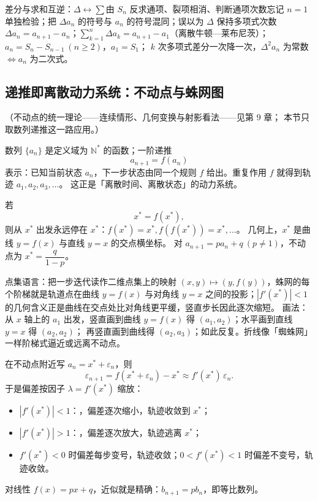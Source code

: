 \begin{explore}
\begin{conccard}[一级]{差分与求和互逆：$\Delta\leftrightarrow\sum$}{由 $S_n$ 反求通项、裂项相消、判断通项次数}{忘记 $n=1$ 单独检验；把 $\Delta a_n$ 的符号与 $a_n$ 的符号混同；误以为 $\Delta$ 保持多项式次数}
$\Delta a_n=a_{n+1}-a_n$；$\sum_{k=1}^n\Delta a_k=a_{n+1}-a_1$（离散牛顿—莱布尼茨）；
$a_n=S_n-S_{n-1}\ (n\ge2)$，$a_1=S_1$；
$k$ 次多项式差分一次降一次，$\Delta^2a_n$ 为常数 $\iff a_n$ 为二次式。
\end{conccard}

\subsection{递推即离散动力系统：不动点与蛛网图}

（不动点的统一理论——连续情形、几何变换与射影看法——见第 9 章；
本节只取数列递推这一路应用。）


数列 $\{a_n\}$ 是定义域为 $\mathbb{N}^*$ 的函数；一阶递推
\[
  a_{n+1}=f(a_n)
\]
表示：已知当前状态 $a_n$，下一步状态由同一个规则 $f$ 给出。重复作用 $f$ 就得到轨迹 $a_1,a_2,a_3,\dots$。
这正是「离散时间、离散状态」的动力系统。

若
\[
  x^*=f(x^*),
\]
则从 $x^*$ 出发永远停在 $x^*$：$f(x^*)=x^*,f(f(x^*))=x^*,\dots$。
几何上，$x^*$ 是曲线 $y=f(x)$ 与直线 $y=x$ 的交点横坐标。
对 $a_{n+1}=pa_n+q\ (p\ne1)$，不动点为 $x^*=\dfrac{q}{1-p}$。

点集语言：把一步迭代读作二维点集上的映射 $(x,y)\mapsto(y,f(y))$，蛛网的每个阶梯就是轨道点在曲线 $y=f(x)$ 与对角线 $y=x$ 之间的投影；$|f'(x^*)|<1$ 的几何含义正是曲线在交点处比对角线更平缓，竖直步长因此逐次缩短。
画法：从 $x$ 轴上的 $a_1$ 出发，竖直画到曲线 $y=f(x)$ 得 $(a_1,a_2)$；水平画到直线 $y=x$ 得 $(a_2,a_2)$；
再竖直画到曲线得 $(a_2,a_3)$；如此反复。折线像「蜘蛛网」一样阶梯式逼近或远离不动点。

在不动点附近写 $a_n=x^*+\varepsilon_n$，则
\[
  \varepsilon_{n+1}=f(x^*+\varepsilon_n)-x^*\approx f'(x^*)\,\varepsilon_n .
\]
于是偏差按因子 $\lambda=f'(x^*)$ 缩放：
\begin{itemize}
  \item $|f'(x^*)|<1$：，偏差逐次缩小，轨迹收敛到 $x^*$；
  \item $|f'(x^*)|>1$：，偏差逐次放大，轨迹逃离 $x^*$；
  \item $f'(x^*)<0$ 时偏差每步变号，轨迹收敛；$0<f'(x^*)<1$ 时偏差不变号，轨迹收敛。
\end{itemize}
对线性 $f(x)=px+q$，近似就是精确：$b_{n+1}=pb_n$，即等比数列。


\end{explore}
